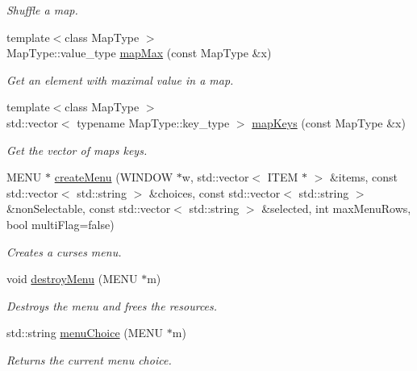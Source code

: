 \begin{DoxyCompactItemize}
\begin{DoxyCompactList}\small\item\em Shuffle a map. \end{DoxyCompactList}\item 
{\footnotesize template$<$class Map\+Type $>$ }\\Map\+Type\+::value\+\_\+type \hyperlink{namespaceslb_1_1core_1_1util_a8fc83cae8daa126707ac247482d4afd5}{map\+Max} (const Map\+Type \&x)
\begin{DoxyCompactList}\small\item\em Get an element with maximal value in a map. \end{DoxyCompactList}\item 
{\footnotesize template$<$class Map\+Type $>$ }\\std\+::vector$<$ typename Map\+Type\+::key\+\_\+type $>$ \hyperlink{namespaceslb_1_1core_1_1util_a0975bcf7bb57af83fdd47dd4cbaeec29}{map\+Keys} (const Map\+Type \&x)
\begin{DoxyCompactList}\small\item\em Get the vector of map\textquotesingle{}s keys. \end{DoxyCompactList}\item 
M\+E\+NU $\ast$ \hyperlink{namespaceslb_1_1core_1_1util_a9ecb2bc008a69c458151515197ce018c}{create\+Menu} (W\+I\+N\+D\+OW $\ast$w, std\+::vector$<$ I\+T\+EM $\ast$ $>$ \&items, const std\+::vector$<$ std\+::string $>$ \&choices, const std\+::vector$<$ std\+::string $>$ \&non\+Selectable, const std\+::vector$<$ std\+::string $>$ \&selected, int max\+Menu\+Rows, bool multi\+Flag=false)
\begin{DoxyCompactList}\small\item\em Creates a {\ttfamily curses} menu. \end{DoxyCompactList}\item 
void \hyperlink{namespaceslb_1_1core_1_1util_a1ba19280252473582d7a52ff677107be}{destroy\+Menu} (M\+E\+NU $\ast$m)
\begin{DoxyCompactList}\small\item\em Destroys the menu and frees the resources. \end{DoxyCompactList}\item 
std\+::string \hyperlink{namespaceslb_1_1core_1_1util_a5f6196dcf481c926229079d9b4153cbc}{menu\+Choice} (M\+E\+NU $\ast$m)
\begin{DoxyCompactList}\small\item\em Returns the current menu choice. \end{DoxyCompactList}\item 

\end{DoxyCompactItemize}
